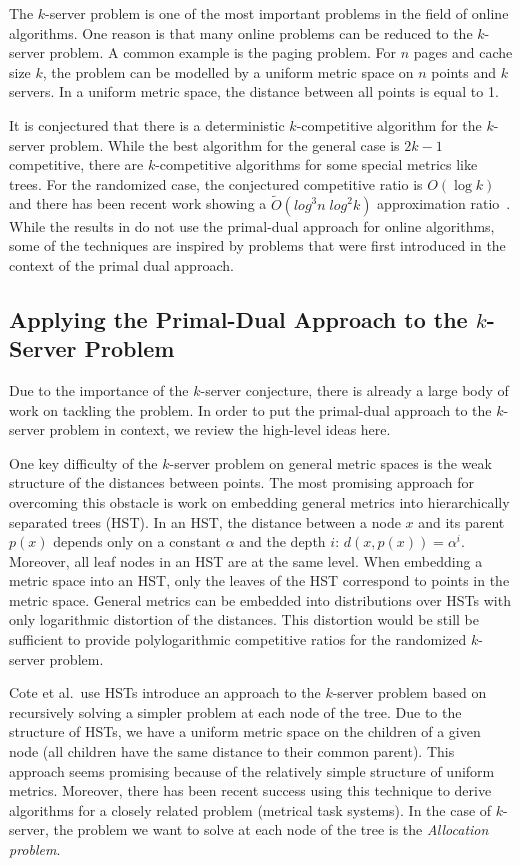 The $k$-server problem is one of the most important problems in the field of online algorithms.
One reason is that many online problems can be reduced to the $k$-server problem.
A common example is the paging problem. For $n$ pages and cache size $k$, the problem can be modelled by a uniform metric space on $n$ points and $k$ servers.
In a uniform metric space, the distance between all points is equal to 1.

It is conjectured that there is a deterministic $k$-competitive algorithm for the $k$-server problem.
While the best algorithm for the general case is $2k -1$ competitive, there are $k$-competitive algorithms for some special metrics like trees.
For the randomized case, the conjectured competitive ratio is $O(\log k)$ and there has been recent work showing a $\tilde{O}(log^3 n \; log^2 k)$ approximation ratio~\cite{bansal11:randomized-k-server}.
While the results in \cite{bansal11:randomized-k-server} do not use the primal-dual approach for online algorithms, some of the techniques are inspired by problems that were first introduced in the context of the primal dual approach.

\subsection{Applying the Primal-Dual Approach to the $k$-Server Problem}
Due to the importance of the $k$-server conjecture, there is already a large body of work on tackling the problem.
In order to put the primal-dual approach to the $k$-server problem in context, we review the high-level ideas here.

One key difficulty of the $k$-server problem on general metric spaces is the weak structure of the distances between points.
The most promising approach for overcoming this obstacle is work on embedding general metrics into hierarchically separated trees (HST).
In an HST, the distance between a node $x$ and its parent $p(x)$ depends only on a constant $\alpha$ and the depth $i$: $d(x, p(x)) = \alpha^i$.
Moreover, all leaf nodes in an HST are at the same level.
When embedding a metric space into an HST, only the leaves of the HST correspond to points in the metric space.
General metrics can be embedded into distributions over HSTs with only logarithmic distortion of the distances.
This distortion would be still be sufficient to provide polylogarithmic competitive ratios for the randomized $k$-server problem.

Cote et al.\ use HSTs introduce an approach to the $k$-server problem based on recursively solving a simpler problem at each node of the tree.
Due to the structure of HSTs, we have a uniform metric space on the children of a given node (all children have the same distance to their common parent).
This approach seems promising because of the relatively simple structure of uniform metrics.
Moreover, there has been recent success using this technique to derive algorithms for a closely related problem (metrical task systems).
In the case of $k$-server, the problem we want to solve at each node of the tree is the \emph{Allocation problem}.

